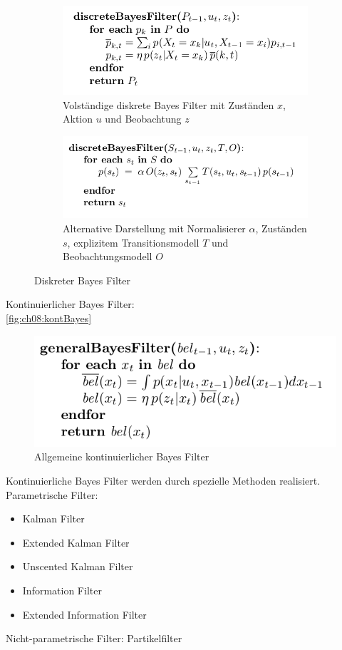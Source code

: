\begin{figure}
\centering
\begin{subfigure}{.5\textwidth}
  \centering
  \includegraphics[width=\linewidth]{figures/ch08_diskreterBayes.png}
  \caption{Volst\"andige diskrete Bayes Filter mit Zust\"anden $x$, Aktion $u$ und Beobachtung $z$}
  \label{fig:sub1}
\end{subfigure}%
\begin{subfigure}{.5\textwidth}
  \centering
  \includegraphics[width=\linewidth]{figures/ch08_diskreterBayesAlter.png}
  \caption{Alternative Darstellung mit Normalisierer $\alpha$, Zust\"anden $s$, explizitem Transitionsmodell $T$ und Beobachtungsmodell $O$}
  \label{fig:sub2}
\end{subfigure}
\caption{Diskreter Bayes Filter}
\label{fig:ch08:diskBayes}
\end{figure}

Kontinuierlicher Bayes Filter:\\
\autoref{fig:ch08:kontBayes}
\begin{figure}
	\centering
  \includegraphics[width=0.5\linewidth]{figures/ch08_kontinuierlicherBayes.png}
\caption{Allgemeine kontinuierlicher Bayes Filter}
\label{fig:ch08:kontBayes}
\end{figure}
Kontinuierliche Bayes Filter werden durch spezielle Methoden realisiert.
Parametrische Filter:
\begin{itemize}
	\item Kalman Filter
	\item Extended Kalman Filter
	\item Unscented Kalman Filter
	\item Information Filter
	\item Extended Information Filter
\end{itemize}
Nicht-parametrische Filter: Partikelfilter\\

